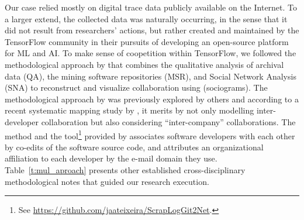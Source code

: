 \documentclass[CHICAGO,Times1COL]{WileyNJDv5} %
\begin{document}
% 
Our case relied mostly on digital trace data publicly available on the Internet. To a larger extend, the  collected data was naturally occurring, in the sense that it did not result from
researchers' actions, but rather created and maintained by the TensorFlow community in their pursuits of developing an open-source platform for \ac{ML} and
\ac{AI}.
To make sense of coopetition within TensorFlow, we followed the methodological approach by \citet{teixeira2015lessons} that combines the qualitative analysis of archival data (QA), the mining software repositories (MSR), and Social Network Analysis (SNA) to reconstruct and visualize collaboration using (sociograms). The methodological approach by  \citet{teixeira2015lessons} was previously explored by
others \citep[e.g.,][]{ZhangZhou_et_al2021} and according to a recent systematic mapping study by \citet[][p.~12]{HerboldAmirfallah_et_al2021}, it merits by not only
modelling inter-developer collaboration but also considering ``inter-company'' collaborations. 
The method and the tool\footnote{See \href{https://github.com/jaateixeira/ScrapLogGit2Net}{https://github.com/jaateixeira/ScrapLogGit2Net}.} provided by \citet{teixeira2015lessons} associates software developers with each other by co-edits of the software source code, and attributes an organizational affiliation to each developer by the e-mail domain they use. 
Table~\ref{t:mul_aproach} presents other established cross-disciplinary
methodological notes that guided our research execution.

 
\end{document}

